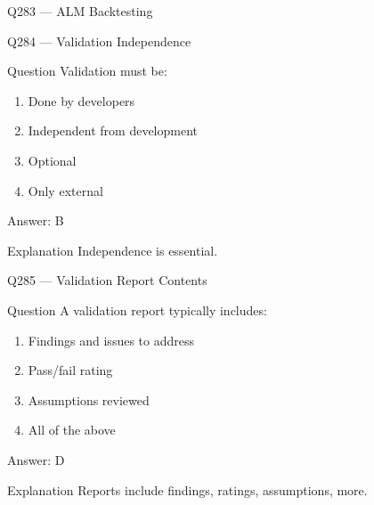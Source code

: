 \documentclass[aspectratio=169,8pt]{beamer}
\begin{document}
\begin{frame}{Q283 --- ALM Backtesting}
\end{frame}

\begin{frame}{Q284 --- Validation Independence}
\begin{block}{Question}
	Validation must be:
	\begin{enumerate}
		\item Done by developers
		\item Independent from development
		\item Optional
		\item Only external
	\end{enumerate}
\end{block}
\begin{exampleblock}{Answer: B}\end{exampleblock}
\begin{block}{Explanation}
	Independence is essential.
\end{block}
\end{frame}

\begin{frame}{Q285 --- Validation Report Contents}
\begin{block}{Question}
	A validation report typically includes:
	\begin{enumerate}
		\item Findings and issues to address
		\item Pass/fail rating
		\item Assumptions reviewed
		\item All of the above
	\end{enumerate}
\end{block}
\begin{exampleblock}{Answer: D}\end{exampleblock}
\begin{block}{Explanation}
	Reports include findings, ratings, assumptions, more.
\end{block}
\end{frame}
\end{document}
